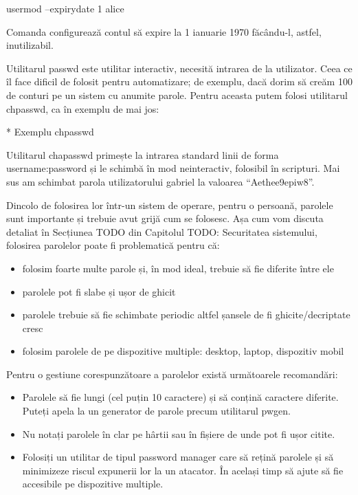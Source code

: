 \begin{screen}
usermod --expirydate 1 alice
\end{screen}

Comanda configurează contul să expire la 1 ianuarie 1970 făcându-l, astfel,
inutilizabil.

Utilitarul passwd este utilitar interactiv, necesită intrarea de la utilizator.
Ceea ce îl face dificil de folosit pentru automatizare; de exemplu, dacă dorim
să creăm 100 de conturi pe un sistem cu anumite parole. Pentru aceasta putem
folosi utilitarul chpasswd, ca în exemplu de mai jos:

* Exemplu chpasswd

Utilitarul chapasswd primește la intrarea standard linii de forma
username:password și le schimbă în mod neinteractiv, folosibil în scripturi. Mai
sus am schimbat parola utilizatorului gabriel la valoarea “Aethee9epiw8”.

Dincolo de folosirea lor într-un sistem de operare, pentru o persoană, parolele
sunt importante și trebuie avut grijă cum se folosesc. Așa cum vom discuta
detaliat în Secțiunea TODO din Capitolul TODO: Securitatea sistemului, folosirea
parolelor poate fi problematică pentru că:

\begin{itemize}
	\item folosim foarte multe parole și, în mod ideal, trebuie să fie
		diferite între ele
	\item parolele pot fi slabe și ușor de ghicit
	\item parolele trebuie să fie schimbate periodic altfel șansele de fi
		ghicite/decriptate cresc
	\item folosim parolele de pe dispozitive multiple: desktop, laptop,
		dispozitiv mobil
\end{itemize}

Pentru o gestiune corespunzătoare a parolelor există următoarele recomandări:

\begin{itemize}
	\item Parolele să fie lungi (cel puțin 10 caractere) și să conțină
		caractere diferite. Puteți apela la un generator de parole
		precum utilitarul pwgen.
	\item Nu notați parolele în clar pe hârtii sau în fișiere de unde pot fi
		ușor citite.
	\item Folosiți un utilitar de tipul password manager care să rețină
		parolele și să minimizeze riscul expunerii lor la un atacator.
		În același timp să ajute să fie accesibile pe dispozitive
		multiple.
\end{itemize}

